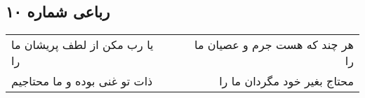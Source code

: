 \begin{center}
\section*{رباعی شماره ۱۰}
\label{sec:sh010}
\begin{longtable}{l p{0.5cm} r}
یا رب مکن از لطف پریشان ما را
&&
هر چند که هست جرم و عصیان ما را
\\
ذات تو غنی بوده و ما محتاجیم
&&
محتاج بغیر خود مگردان ما را
\\
\end{longtable}
\end{center}
